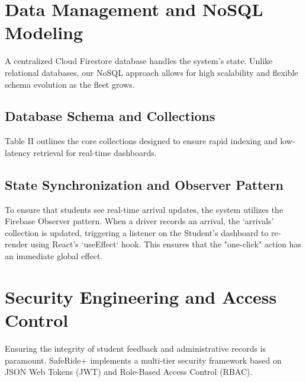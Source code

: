 \documentclass[conference]{IEEEtran}
\begin{document}
\section{Data Management and NoSQL Modeling}
A centralized Cloud Firestore database handles the system's state. Unlike relational databases, our NoSQL approach allows for high scalability and flexible schema evolution as the fleet grows.

\subsection{Database Schema and Collections}
Table II outlines the core collections designed to ensure rapid indexing and low-latency retrieval for real-time dashboards.

\begin{table}[H]
\caption{SafeRide+ Firestore Schema Definition}
\centering
{}
\end{table}

\subsection{State Synchronization and Observer Pattern}
To ensure that students see real-time arrival updates, the system utilizes the Firebase Observer pattern. When a driver records an arrival, the `arrivals' collection is updated, triggering a listener on the Student's dashboard to re-render using React’s `useEffect` hook. This ensures that the "one-click" action has an immediate global effect.

\section{Security Engineering and Access Control}
Ensuring the integrity of student feedback and administrative records is paramount. SafeRide+ implements a multi-tier security framework based on JSON Web Tokens (JWT) and Role-Based Access Control (RBAC).
\end{document}

